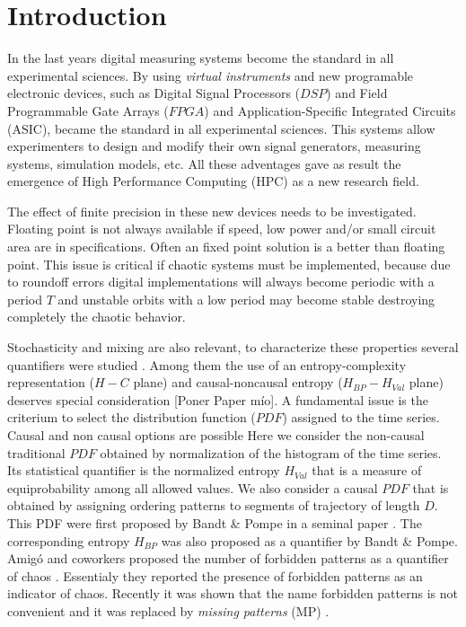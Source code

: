 \section{Introduction} \label{sec:intro}

In the last years digital measuring systems become the standard in all experimental sciences.
By using \textit{virtual instruments} and new programable electronic devices, such as Digital Signal Processors ($DSP$) and Field Programmable Gate Arrays ($FPGA$) and Application-Specific Integrated Circuits (ASIC), became the standard in all experimental sciences.
This systems allow experimenters to design and modify their own signal generators, measuring systems, simulation models, etc.
All these adventages gave as result the emergence of High Performance Computing (HPC) as a new research field.

The effect of finite precision in these new devices needs to be investigated.
Floating point is not always available if speed, low power and/or small circuit area are in specifications.
Often an fixed point solution is a better than floating point.
This issue is critical if chaotic systems must be implemented, because due to roundoff errors digital implementations will always become periodic with a period $T$ and unstable orbits with a low period may become stable destroying completely the chaotic behavior.

Stochasticity and mixing are also relevant, to characterize these properties several quantifiers were studied \cite{DeMicco2009}.
Among them the use of an entropy-complexity representation ($H-C$ plane) and causal-noncausal entropy ($H_{BP}-H_{Val}$ plane) deserves special consideration \cite{Rosso2007C,DeMicco2008,DeMicco2011,DeMicco2009,Rosso2009}[Poner Paper mío].
A fundamental issue is the criterium to select the distribution function ($PDF$) assigned to the time series.
Causal and non causal options are possible
Here we consider the non-causal traditional $PDF$ obtained by normalization of the histogram of the time series.
Its statistical quantifier is the normalized entropy $H_{Val}$ that is a measure of equiprobability among all allowed values.
We also consider a causal $PDF$ that is obtained by assigning ordering patterns to segments of trajectory of length $D$.
This PDF were first proposed by Bandt \& Pompe in a seminal paper \cite{Pompe2002}.
The corresponding entropy $H_{BP}$ was also proposed as a quantifier by Bandt \& Pompe.
Amig\'o and coworkers proposed the number of forbidden patterns as a quantifier of chaos \cite{Amigo2007b}.
Essentialy they reported the presence of forbidden patterns as an indicator of chaos.
Recently it was shown that the name forbidden patterns is not convenient and it was replaced by \textit{missing patterns }(MP) \cite{Rosso2012b}.

